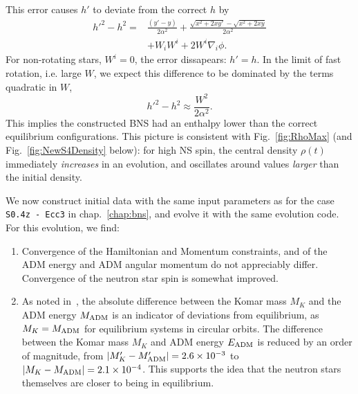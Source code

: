 \begin{subappendices}
This error causes $h'$ to deviate from the correct $h$ by
\begin{align}
h'^2-h^2 =& 
\frac{\left(y'-y\right)}{2\alpha^2}+\frac{\sqrt{x^2+2xy'}-\sqrt{x^2+2xy}}{2\alpha^2} \nonumber \\
& +W_iW^i+2W^i\nabla_i\phi.
\end{align}
For non-rotating stars, $W^i=0$, the error dissapears: $h'\!=\!h$. 
In the limit of fast rotation, i.e. large $W$, we expect this difference
to be dominated by the terms quadratic in $W$,
\begin{equation}\label{eq:diff-h-high-W}
h'^2-h^2 \approx \frac{W^2}{2\alpha^2}.
\end{equation}
This implies the constructed BNS had an enthalpy
lower than the correct equilibrium configurations.  This picture is
consistent with Fig.~\ref{fig:RhoMax} (and
Fig.~\ref{fig:NewS4Density} below): for high NS spin, the central
density $\rho(t)$ immediately {\it increases} in an evolution, and
oscillates around values {\it larger} than the initial
density.

We now construct initial data with the same input parameters as for the case
{\tt S0.4z - Ecc3} in chap.~\ref{chap:bns}, and evolve it with the same
evolution code. For this evolution, we find:

\begin{enumerate}
\item Convergence of the Hamiltonian and Momentum constraints, and of the ADM energy and ADM angular momentum
  do not appreciably differ. Convergence of the neutron star spin is
  somewhat improved.

\item As noted in~\cite{0264-9381-11-2-015}, the absolute difference between the Komar mass $M_K$ and the
ADM energy $M_{\rm ADM}$ is an indicator of deviations from
equilibrium, as $M_K=M_{\rm ADM}$ for equilibrium systems in circular
orbits.
The difference between  the Komar mass $M_K$ and ADM energy $E_{\rm
  ADM}$ is reduced by an order of magnitude, from $|M'_K-M'_{\rm
  ADM}|=2.6\times10^{-3}$ to $|M_K-M_{\rm ADM}|=2.1\times10^{-4}$.
This supports the
idea that the neutron stars themselves are closer to being in
equilibrium.


\end{enumerate}
\end{subappendices}

